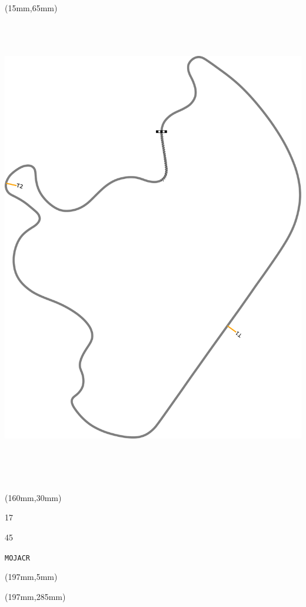 \begin{textblock*}{185mm}(15mm,65mm)%
\centering
\mbox{\includegraphics[width=185mm,height=210mm,keepaspectratio]{PT/MOJACR.pdf}}
\end{textblock*}
\begin{textblock*}{40mm}(160mm,30mm)%
\Large
\par{} 
\par17 
\par45 
\par\hfill\tiny\tt MOJACR\\
\end{textblock*}
\begin{textblock*}{20mm}(197mm,5mm)%
\fbox{\thepage}
\label{MOJACR}
\end{textblock*}
\begin{textblock*}{20mm}(197mm,285mm)%
\fbox{\thepage}
\end{textblock*}

